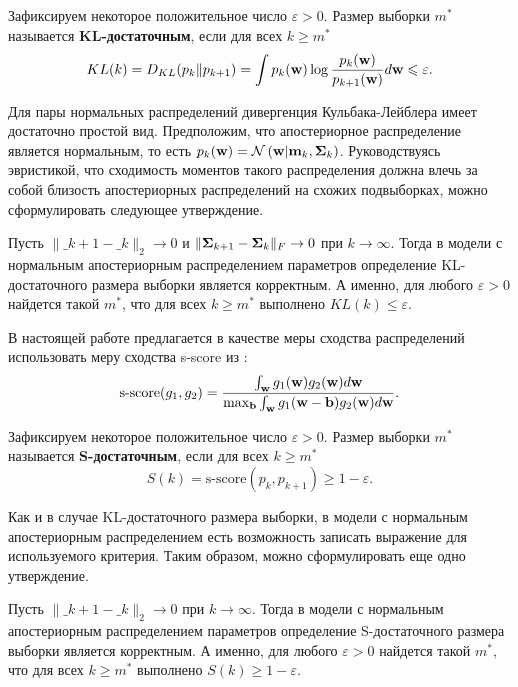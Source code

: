 \begin{definition}
    Зафиксируем некоторое положительное число $\varepsilon > 0$. Размер выборки $m^*$ называется \textbf{KL-достаточным}, если для всех $k \geqslant m^*$
    \[ KL(k) = D_{KL}(p_k \| p_{k+1}) = \int p_k(\mathbf{w}) \log{\dfrac{p_k(\mathbf{w})}{p_{k+1}(\mathbf{w})}} d\mathbf{w} \leqslant \varepsilon. \]
\end{definition}

Для пары нормальных распределений дивергенция Кульбака-Лейблера имеет достаточно простой вид. Предположим, что апостериорное распределение является нормальным, то есть $p_k(\mathbf{w}) = \mathcal{N}\left( \mathbf{w} | \mathbf{m}_k, \boldsymbol{\Sigma}_k \right)$. Руководствуясь эвристикой, что сходимость моментов такого распределения должна влечь за собой близость апостериорных распределений на схожих подвыборках, можно сформулировать следующее утверждение.

\begin{theorem}[Киселев, 2024]\label{theorem2}
    Пусть $\| \bm_{k+1} - \bm_k \|_2 \to 0$ и $\| \boldsymbol{\Sigma}_{k+1} - \boldsymbol{\Sigma}_k \|_{F} \to 0$ при $k \to \infty$. Тогда в модели с нормальным апостериорным распределением параметров определение KL-достаточного размера выборки является корректным. А именно, для любого $\varepsilon > 0$ найдется такой $m^*$, что для всех $k \geqslant m^*$ выполнено $KL(k) \leqslant \varepsilon$.
\end{theorem}

В настоящей работе предлагается в качестве меры сходства распределений использовать меру сходства s-score из \citep{Aduenko2017}:
\[ \text{s-score}(g_1, g_2) = \dfrac{\int_{\mathbf{w}} g_1(\mathbf{w}) g_2(\mathbf{w}) d\mathbf{w}}{\max_{\mathbf{b}} \int_{\mathbf{w}} g_1(\mathbf{w} - \mathbf{b}) g_2(\mathbf{w}) d\mathbf{w}}. \]

\begin{definition}
    Зафиксируем некоторое положительное число $\varepsilon > 0$. Размер выборки $m^*$ называется \textbf{S-достаточным}, если для всех $k \geqslant m^*$
    \[ S(k) = \text{s-score}(p_k, p_{k+1}) \geqslant 1-\varepsilon. \]
\end{definition}

Как и в случае KL-достаточного размера выборки, в модели с нормальным апостериорным распределением есть возможность записать выражение для используемого критерия. Таким образом, можно сформулировать еще одно утверждение.

\begin{theorem}[Киселев, 2024]\label{theorem3}
    Пусть $\| \bm_{k+1} - \bm_k \|_2 \to 0$ при $k \to \infty$. Тогда в модели с нормальным апостериорным распределением параметров определение S-достаточного размера выборки является корректным. А именно, для любого $\varepsilon > 0$ найдется такой $m^*$, что для всех $k \geqslant m^*$ выполнено $S(k) \geqslant 1-\varepsilon$.
\end{theorem}

